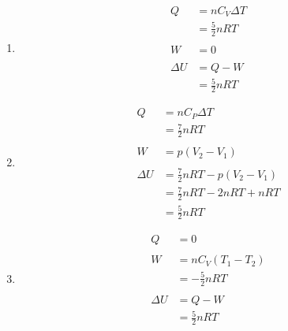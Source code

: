 \documentclass{article}
\begin{document}
\subsubsection{}

\begin{enumerate}
  \item

        \begin{align*}
          Q        & = n C_V \Delta T    \\
                   & = \frac{5}{2} n R T \\ \\
          W        & = 0                 \\ \\
          \Delta U & = Q - W             \\
                   & = \frac{5}{2} n R T
        \end{align*}

  \item

        \begin{align*}
          Q        & = n C_P \Delta T                      \\
                   & = \frac{7}{2} n R T                   \\ \\
          W        & = p (V_2 - V_1)                       \\ \\
          \Delta U & = \frac{7}{2} n R T - p (V_2 - V_1)   \\
                   & = \frac{7}{2} n R T - 2 n R T + n R T \\
                   & = \frac{5}{2} n R T
        \end{align*}

  \item

        \begin{align*}
          Q        & = 0                  \\ \\
          W        & = n C_V (T_1 - T_2)  \\
                   & = -\frac{5}{2} n R T \\ \\
          \Delta U & = Q - W              \\
                   & = \frac{5}{2} n R T
        \end{align*}
\end{enumerate}
\end{document}
